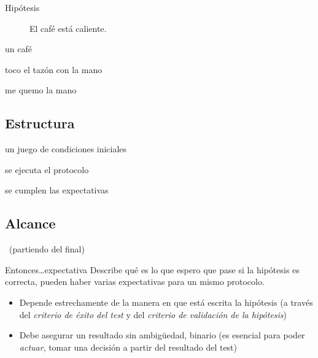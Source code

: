   \begin{frame}{\insertsubsection}
    \vspace{-2.8em}
    \begin{description}
      \item[Hipótesis] El café está caliente.
    \end{description}
    \vspace{+0.7em}
    \begin{description}
      \item<2->[\alert{Dado}] un café
      \item<3->[\alert{Cuando}] toco el tazón con la mano
      \item<4->[\alert{Entonces}] me quemo la mano
    \end{description}
  \end{frame}

%
\subsection{Estructura}

  \begin{frame}{\insertsubsection}
    \begin{description}
      \item<2->[Dado] un juego de \alert{condiciones iniciales}
      \item<3->[Cuando] se ejecuta el \alert{protocolo}
      \item<4->[Entonces] se cumplen las \alert{expectativas}
    \end{description}
  \end{frame}

%
\subsection{Alcance}

  \begin{frame}[label=expectativa]{\insertsubsection~(partiendo del final)}

    \begin{block}{Entonces\dots \alert{expectativa}}
      Describe qué es lo que espero que pase si la hipótesis es correcta,
      pueden haber varias expectativas para un mismo protocolo.
    \end{block}
    \begin{block}{}
      \begin{itemize}
        \item Depende estrechamente de la manera en que está escrita la hipótesis (a través del \emph{criterio de éxito del test} y del \emph{criterio de validación de la hipótesis})
        \hyperlink{criterios}{}
        \item Debe asegurar un resultado sin ambigüedad, \alert{binario} (es esencial para poder \alert{\emph{actuar}}, tomar una decisión a partir del resultado del test)
      \end{itemize}
    \end{block}
  \end{frame}

